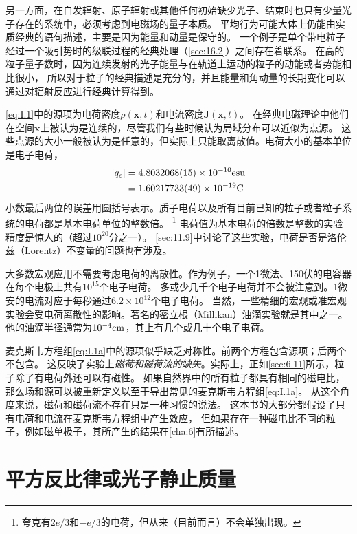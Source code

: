 \documentclass[12pt]{book}
\numberwithin{equation}{chapter}
\numberwithin{figure}{chapter}
\numberwithin{footnote}{page}
\begin{document}
另一方面，在自发辐射、原子辐射或其他任何初始缺少光子、结束时也只有少量光子存在的系统中，必须考虑到电磁场的量子本质。
平均行为可能大体上仍能由实质经典的语句描述，主要是因为能量和动量是保守的。
一个例子是单个带电粒子经过一个吸引势时的级联过程的经典处理（\autoref{sec:16.2}）之间存在着联系。
在高的粒子量子数时，因为连续发射的光子能量与在轨道上运动的粒子的动能或者势能相比很小，
所以对于粒子的经典描述是充分的，并且能量和角动量的长期变化可以通过对辐射反应进行经典计算得到。

\autoref{eq:I.1}中的源项为电荷密度$\rho(\mathbf{x},t)$和电流密度$\mathbf{J}(\mathbf{x},t)$。
在经典电磁理论中他们在空间$\mathbf{x}$上被认为是连续的，尽管我们有些时候认为局域分布可以近似为点源。
这些点源的大小一般被认为是任意的，但实际上只能取离散值。电荷大小的基本单位是电子电荷，
$$\begin{align}
        |q_e| & =4.8032068(15)\times10^{-10}{\rm esu} \\
              & = 1.60217733(49)\times10^{-19}{\rm C}
    \end{align}$$
小数最后两位的误差用圆括号表示。质子电荷以及所有目前已知的粒子或者粒子系统的电荷都是基本电荷单位的整数倍。
\footnote{夸克有$2e/3$和$-e/3$的电荷，但从来（目前而言）不会单独出现。}
电荷值为基本电荷的倍数是整数的实验精度是惊人的（超过$10^{20}$分之一）。
\autoref{sec:11.9}中讨论了这些实验，电荷是否是洛伦兹（Lorentz）不变量的问题也有涉及。

大多数宏观应用不需要考虑电荷的离散性。作为例子，一个1微法、150伏的电容器在每个电极上共有$10^{15}$个电子电荷。
多或少几千个电子电荷并不会被注意到。1微安的电流对应于每秒通过$6.2\times 10^{12}$个电子电荷。
当然，一些精细的宏观或准宏观实验会受电荷离散性的影响。著名的密立根（Millikan）油滴实验就是其中之一。
他的油滴半径通常为$10^{-4}{\rm cm}$，其上有几个或几十个电子电荷。

麦克斯韦方程组\autoref{eq:I.1a}中的源项似乎缺乏对称性。前两个方程包含源项；后两个不包含。
这反映了实验上\textit{磁荷和磁荷流的缺失}。实际上，正如\autoref{sec:6.11}所示，粒子除了有电荷外还可以有磁性。
如果自然界中的所有粒子都具有相同的磁电比，那么场和源可以被重新定义以至于导出常见的麦克斯韦方程组\autoref{eq:I.1a}。
从这个角度来说，磁荷和磁荷流不存在只是一种习惯的说法。
这本书的大部分都假设了只有电荷和电流在麦克斯韦方程组中产生效应，
但如果存在一种磁电比不同的粒子，例如磁单极子，其所产生的结果在\autoref{cha:6}有所描述。

\section{平方反比律或光子静止质量}\label{sec:I.2}
\end{document}

